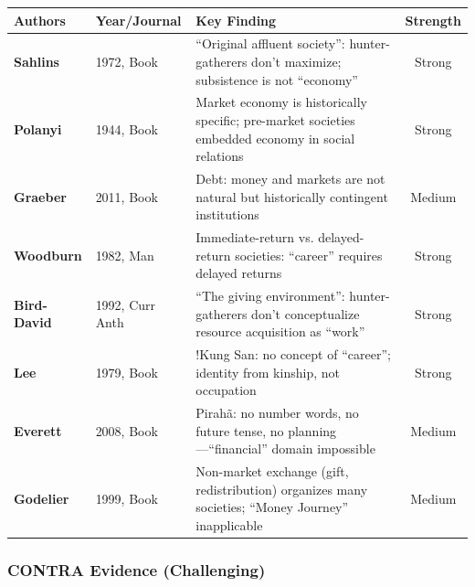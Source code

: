 \begin{center}
\scriptsize
\begin{longtable}{@{}p{3cm}p{2cm}p{6cm}c@{}}
\toprule
\textbf{Authors} & \textbf{Year/Journal} & \textbf{Key Finding} & \textbf{Strength} \\
\midrule
\endfirsthead
\bottomrule
\endlastfoot
\textbf{Sahlins} & 1972, Book & ``Original affluent society'': hunter-gatherers don't maximize; subsistence is not ``economy'' & Strong \\
\textbf{Polanyi} & 1944, Book & Market economy is historically specific; pre-market societies embedded economy in social relations & Strong \\
\textbf{Graeber} & 2011, Book & Debt: money and markets are not natural but historically contingent institutions & Medium \\
\textbf{Woodburn} & 1982, Man & Immediate-return vs. delayed-return societies: ``career'' requires delayed returns & Strong \\
\textbf{Bird-David} & 1992, Curr Anth & ``The giving environment'': hunter-gatherers don't conceptualize resource acquisition as ``work'' & Strong \\
\textbf{Lee} & 1979, Book & !Kung San: no concept of ``career''; identity from kinship, not occupation & Strong \\
\textbf{Everett} & 2008, Book & Pirahã: no number words, no future tense, no planning---``financial'' domain impossible & Medium \\
\textbf{Godelier} & 1999, Book & Non-market exchange (gift, redistribution) organizes many societies; ``Money Journey'' inapplicable & Medium \\
\end{longtable}
\end{center}

\subsubsection{CONTRA Evidence (Challenging)}

